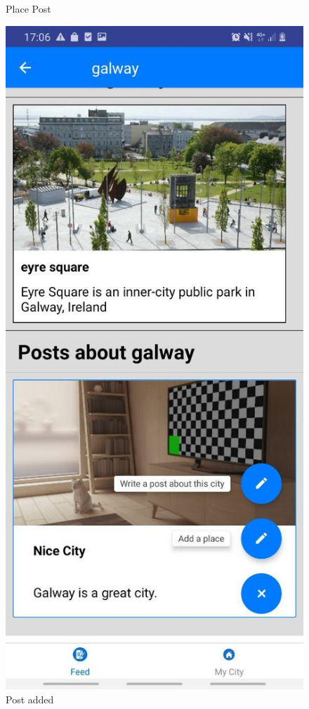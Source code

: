 \begin{figure}[h!]
\begin{minipage}[t]{0.48\textwidth}
\caption{Place Post}
\label{Place Post}
\end{minipage}
\hspace*{\fill} %
\begin{minipage}[t]{0.48\textwidth}
\includegraphics[width=\linewidth,keepaspectratio=true]{img/posts.jpg}
\caption{Post added}
\label{fig:Post Added}
\end{minipage}
\end{figure}





